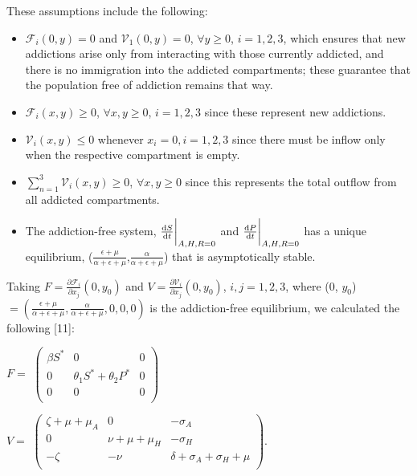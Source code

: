 \documentclass[12pt]{article}
\begin{document}
These assumptions include the following: 
\begin{itemize}
\item $\mathscr{F}_{i} (0,y)=0$ and $\mathscr{V}_{1}(0,y)=0$,  $\forall$$y \geq 0$, $i=1,2,3$, which ensures that new addictions arise only from interacting with those currently addicted, and there is no immigration into the addicted compartments; these guarantee that the population free of addiction remains that way. 
\item $\mathscr{F}_{i} (x,y) \geq 0$, $\forall$$x,y \geq 0$, $i=1,2,3$ since these represent new addictions. 
\item $\mathscr{V}_{i}(x,y) \leq 0$ whenever $x_i=0, i=1,2,3$ since there must be inflow only when the respective compartment is empty. 
\item $\sum_{n=1}^{3} \mathscr{V}_{i}(x,y) \geq 0$, $\forall x,y \geq 0$ since this represents the total outflow from all addicted compartments. 
\item The addiction-free system, $\dv{S}{t}\bigg|_{A,H,R=0}$ and $\dv{P}{t}\bigg|_{A,H,R=0}$ has a unique equilibrium, ($\frac{\epsilon+\mu}{\alpha+\epsilon+\mu}$,$\frac{\alpha}{\alpha+\epsilon+\mu}$) that is asymptotically stable. 
\end{itemize}

Taking $F=\frac{\partial \mathscr{F}_i}{\partial x_j} (0, y_0)$ and $V=\frac{\partial \mathscr{V}_i}{\partial x_j} (0, y_0)$, $i, j =1, 2, 3$, where (0, $y_{0}$) $=(\frac{\epsilon + \mu}{\alpha + \epsilon +\mu},\frac{\alpha}{\alpha + \epsilon +\mu},0,0,0)$ is the addiction-free equilibrium, we calculated the following [11]: 



\begin{center}
$F=$
$ \begin{pmatrix}

\beta S^* &  0  & 0 \\
0 & \theta_1 S^* +\theta_2 P^* & 0\\
0  &   0 & 0\\
\end{pmatrix}$



$V=$
$ \begin{pmatrix}

\zeta +\mu +\mu_A &  0  & -\sigma_A \\
0 &  \nu+\mu+\mu_H & -\sigma_H\\
-\zeta& -\nu  & \delta + \sigma_A + \sigma_H + \mu\\

\end{pmatrix}$.
\end{center}
\end{document}
